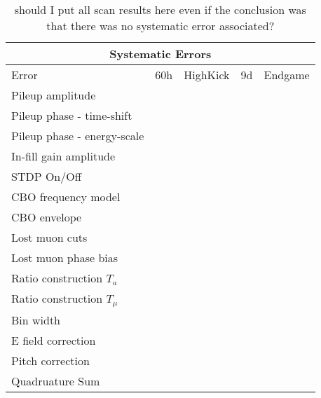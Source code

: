 \begin{table}[]
\centering
\renewcommand{\arraystretch}{1.2}
\begin{tabular*}{\linewidth}{@{\extracolsep{\fill}}lcccc}


  \hline
    \multicolumn{5}{c}{\textbf{Systematic Errors}} \\
  \hline\hline
    Error & 60h & HighKick & 9d & Endgame \\ 
  \hline
    Pileup amplitude & & & & \\
    Pileup phase - time-shift & & & & \\
    Pileup phase - energy-scale & & & & \\
    In-fill gain amplitude & & & & \\
    STDP On/Off & & & & \\
    CBO frequency model & & & & \\
    CBO envelope & & & & \\
    Lost muon cuts & & & & \\
    Lost muon phase bias & & & & \\
    Ratio construction $T_{a}$ & & & & \\
    Ratio construction $T_{\mu}$ & & & & \\
    Bin width & & & & \\
    E field correction & & & & \\
    Pitch correction & & & & \\
  \hline
    Quadruature Sum & & & & \\
  \hline
\end{tabular*}
\caption[]{should I put all scan results here even if the conclusion was that there was no systematic error associated?}
\label{tab:}
\end{table}



